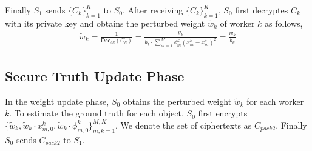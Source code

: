 \documentclass[conference]{IEEEtran}
\begin{document}
Finally $S_1$ sends $\{C_k\}_{k=1}^K$ to $S_0$.
After receiving $\{C_k\}_{k=1}^K$, $S_0$ first decryptes $C_k$ with its private key and obtains the perturbed weight $\tilde{w}_k$ of worker $k$ as follows,
\begin{equation}
  \begin{split}
    \tilde{w}_k = \frac{1}{\mathsf{Dec}_{sk}\left(C_k\right)} = \frac{y_k}{b_k\cdot \sum_{m=1}^M \phi_m^k\left(x_m^k - x_m^*\right)^2} = \frac{w_k}{b_k}
  \end{split}
\end{equation}


\subsection{Secure Truth Update Phase}

In the weight update phase, $S_0$ obtains the perturbed weight $\tilde{w}_k$ for each worker $k$.
To estimate the ground truth for each object, $S_0$ first encrypts $\{\tilde{w}_k, \tilde{w}_k\cdot x_{m,0}^k, \tilde{w}_k\cdot \phi_{m,0}^k\}_{m,k=1}^{M,K}$.
We denote the set of ciphertexts as $C_{pack2}$.
Finally $S_0$ sends $C_{pack2}$ to $S_1$.
\end{document}
